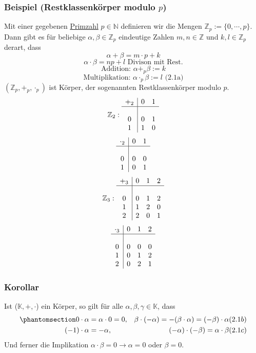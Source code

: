 \subsubsection{Beispiel (Restklassenkörper modulo $p$)}
Mit einer gegebenen \underline{Primzahl} $p\in\mathbb{N}$ definieren wir die Mengen $\mathbb{Z}_p := \{0,\cdots ,p\}$.  Dann gibt es für beliebige $\alpha ,\beta \in \mathbb{Z}_p$ eindeutige Zahlen $m,n\in\mathbb{Z}$ und $k,l\in\mathbb{Z}_p$ derart, dass 
\[\alpha + \beta = m\cdot p+k\]
\[\alpha\cdot\beta = np+l \text{ Divison mit Rest.}\]
\[\text{Addition: }\alpha+_p \beta := k\]
\[\text{Multiplikation: }\alpha \cdot_p \beta := l\text{ (2.1a)}\]
$(\mathbb{Z}_p,+_p,\cdot_p)$ ist Körper, der sogenannten Restklassenkörper modulo $p$.
\[\mathbb{Z}_2: \begin{array}{c|cc}+_2 & 0 & 1\\ \hline\\ 0 & 0 & 1 \\ 1 & 1 & 0\end{array} \]
\[\begin{array}{c|cc}\cdot_2 & 0 & 1\\ \hline \\ 0 & 0 & 0 \\ 1 & 0 & 1\end{array} \]
\[\mathbb{Z}_3: \begin{array}{c|ccc}+_3 & 0 & 1 & 2\\ \hline \\ 0 & 0 & 1 & 2\\ 1 & 1 & 2 & 0\\2 & 2 & 0 & 1\end{array} \]
\[\begin{array}{c|ccc}\cdot_3 & 0 & 1 & 2\\ \hline \\ 0 & 0 & 0 & 0\\ 1 & 0 & 1 & 2\\2 & 0 & 2 & 1\end{array} \]
\subsubsection{Korollar}
Ist ($\mathbb{K},+,\cdot $) ein Körper, so gilt für alle $\alpha ,\beta ,\gamma \in \mathbb{K}$, dass
\begin{align*}
\phantomsection\label{2.1b}0\cdot \alpha &= \alpha \cdot 0 = 0, & \beta\cdot (-\alpha ) = -(\beta \cdot \alpha ) = (-\beta )\cdot \alpha &(2.1b)\\
(-1)\cdot \alpha &= -\alpha , & (-\alpha )\cdot (-\beta ) = \alpha\cdot\beta &(2.1c)
\end{align*}
Und ferner die Implikation $\alpha\cdot\beta = 0 \rightarrow \alpha = 0$ oder $\beta = 0$.
